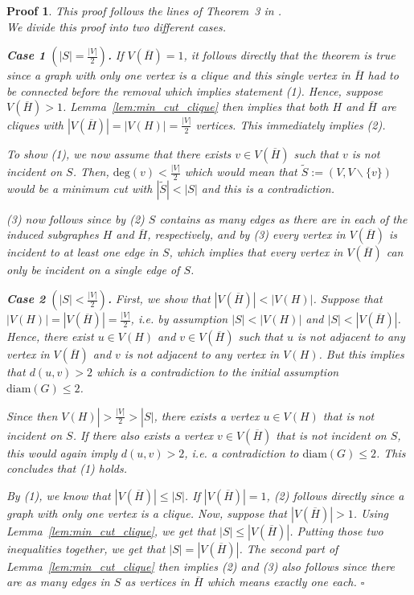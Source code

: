 \documentclass[paper=a4,fontsize=11pt,DIV=8,BCOR=5mm,twoside,pdftex,bibtotocnumbered]{scrreprt}
\newcommand{\diam}{\text{diam}}
\newcommand{\degree}{\text{deg}}
\theoremstyle{plain}
\newtheorem*{myproof}{Proof}
\newenvironment{pf}{\begin{myproof}}{\hfill$\square$\end{myproof}}
\begin{document}
\begin{pf}
	This proof follows the lines of Theorem~3 in \cite{Hartuv2000}.\\
	We divide this proof into two different cases.
	
	\textbf{Case 1} $\left(|S| = \frac{|V|}{2}\right)$\textbf{.} If $V(\overline{H}) = 1$, it follows directly that the theorem is true since a graph with only one vertex is a clique and this single vertex in $\overline{H}$ had to be connected before the removal which implies statement (1). Hence, suppose  $V(\overline{H}) > 1$. Lemma~\ref{lem:min_cut_clique} then implies that both $H$ and $\overline{H}$ are cliques with $|V(\overline H)| = |V(H)| =  \frac{|V|}{2}$ vertices. This immediately implies (2). 
	
	To show (1), we now assume that there exists $v\in V(\overline H)$ such that $v$ is not incident on $S$. Then, $\degree(v) < \frac{|V|}{2}$ which would mean that $\tilde{S}:= (V, V\backslash\{v\})$ would be a minimum cut with $|\tilde{S}| < |S|$ and this is a contradiction. 
	
	(3) now follows since by (2) $S$ contains as many edges as there are in each of the induced subgraphes $H$ and $\overline{H}$, respectively, and by (3) every vertex in $V(\overline H)$ is incident to at least one edge in $S$, which implies that every vertex in $V(\overline H)$ can only be incident on a single edge of $S$.
	
	\textbf{Case 2} $\left(|S| < \frac{|V|}{2}\right)$\textbf{.} First, we show that $|V(\overline H)| < |V(H)|$. Suppose that $|V(H)| = |V(\overline H)| = \frac{|V|}{2}$, i.e. by assumption $|S| < |V(H)|$ and $|S| < |V(\overline H)|$. Hence, there exist $u \in V(H)$ and $v\in V(\overline{H})$ such that $u$ is not adjacent to any vertex in $V(\overline{H})$ and $v$ is not adjacent to any vertex in $V(H)$. But this implies that $d(u,v) > 2$ which is a contradiction to the initial assumption $\diam(G) \le 2$.
	
	Since then $V(H)| > \frac{|V|}{2} > |S|$, there exists a vertex $u \in V(H)$ that is not incident on $S$. If there also exists a vertex $v\in V(\overline{H})$ that is not incident on $S$, this would again imply $d(u,v) > 2$, i.e. a contradiction to $\diam(G) \le 2$. This concludes that (1) holds.
	
	By (1), we know that $|V(\overline{H})| \le |S|$. If $|V(\overline{H})| = 1$, (2) follows directly since a graph with only one vertex is a clique. Now, suppose that $|V(\overline{H})| > 1$. Using Lemma~\ref{lem:min_cut_clique}, we get that $|S| \le |V(\overline{H})|$. Putting those two inequalities together, we get that $|S| = |V(\overline{H})|$. The second part of Lemma~\ref{lem:min_cut_clique} then implies (2) and (3) also follows since there are as many edges in $S$ as vertices in $\overline{H}$ which means exactly one each.
\end{pf}
\end{document}
